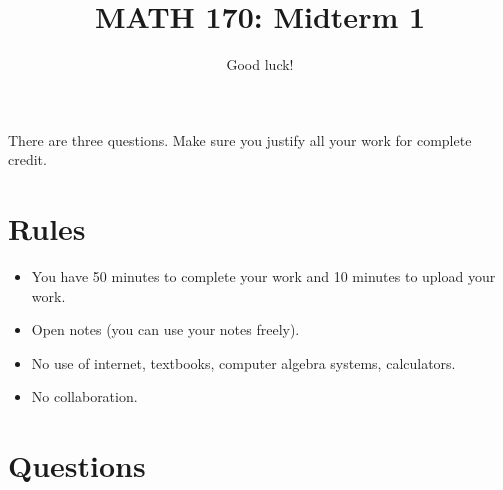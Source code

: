 \documentclass[12pt]{amsart}
\title{ MATH 170: Midterm 1 }
\author{Good luck!}
\date{}
\begin{document}
\maketitle

There are three questions. Make sure you justify all your work for complete credit.

\section*{Rules}

\begin{itemize}[leftmargin=*]
    \item You have 50 minutes to complete your work and 10 minutes to upload your work.
    \item Open notes (you can use your notes freely).
    \item No use of internet, textbooks, computer algebra systems, calculators. 
    \item No collaboration.
\end{itemize}

\section*{Questions}
\end{document}
